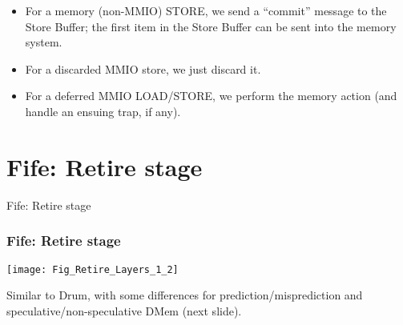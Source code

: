 \begin{frame}[fragile]
\begin{itemize}
  \item For a memory (non-MMIO) STORE, we send a ``commit'' message to
        the Store Buffer; the first item in the Store Buffer can be
        sent into the memory system.

  \item For a discarded MMIO store, we just discard it.

  \item For a deferred MMIO LOAD/STORE, we perform the memory action
        (and handle an ensuing trap, if any).

\end{itemize}

\end{frame}


\section{Fife: Retire stage}

\begin{frame}

\begin{center}
  {\LARGE Fife: Retire stage}
\end{center}

\end{frame}


\begin{frame}[fragile]
\frametitle{Fife: Retire stage}

\footnotesize

\begin{center}
 \texttt{[image: Fig\_Retire\_Layers\_1\_2]}

 Similar to Drum, with some differences for prediction/misprediction
 and speculative/non-speculative DMem (next slide).
\end{center}

\end{frame}


